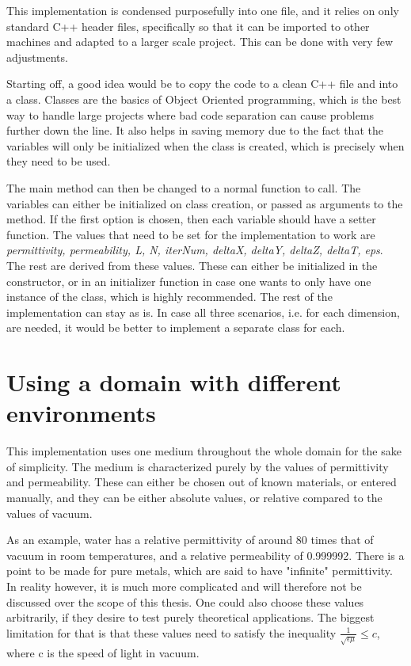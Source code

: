 This implementation is condensed purposefully into one file, and it relies on only standard C++ header files, specifically so that it can be imported to other machines and adapted to a larger scale project. This can be done with very few adjustments.

Starting off, a good idea would be to copy the code to a clean C++ file and into a class. Classes are the basics of Object Oriented programming, which is the best way to handle large projects where bad code separation can cause problems further down the line. It also helps in saving memory due to the fact that the variables will only be initialized when the class is created, which is precisely when they need to be used. 

The main method can then be changed to a normal function to call. The variables can either be initialized on class creation, or passed as arguments to the method. If the first option is chosen, then each variable should have a setter function. The values that need to be set for the implementation to work are \textit{permittivity, permeability, L, N, iterNum, deltaX, deltaY, deltaZ, deltaT, eps}. The rest are derived from these values. These can either be initialized in the constructor, or in an initializer function in case one wants to only have one instance of the class, which is highly recommended. The rest of the implementation can stay as is. In case all three scenarios, i.e. for each dimension, are needed, it would be better to implement a separate class for each.

\section{Using a domain with different environments}

This implementation uses one medium throughout the whole domain for the sake of simplicity. The medium is characterized purely by the values of permittivity and permeability. These can either be chosen out of known materials, or entered manually, and they can be either absolute values, or relative compared to the values of vacuum.

As an example, water has a relative permittivity of around 80 times that of vacuum in room temperatures\textsuperscript{\cite{archer1990dielectric}}, and a relative permeability of 0.999992. There is a point to be made for pure metals, which are said to have "infinite" permittivity. In reality however, it is much more complicated and will therefore not be discussed over the scope of this thesis. One could also choose these values arbitrarily, if they desire to test purely theoretical applications. The biggest limitation for that is that these values need to satisfy the inequality $\frac{1}{\sqrt{\epsilon\mu}} \leq c$, where c is the speed of light in vacuum. 

